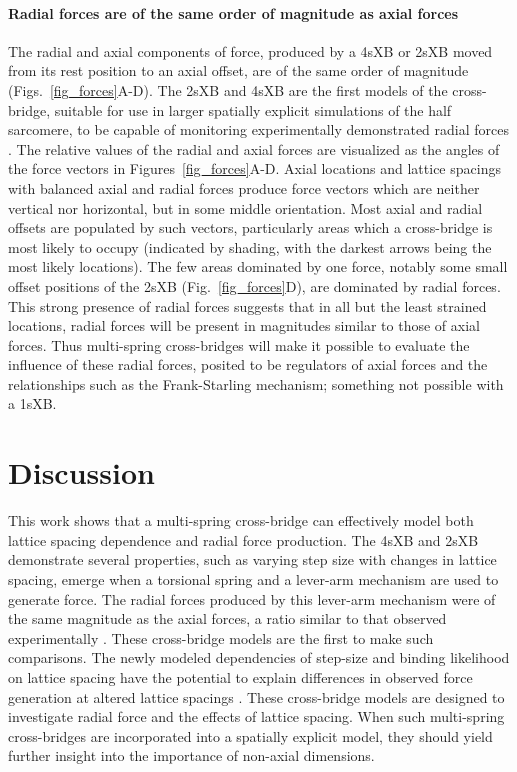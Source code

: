 \documentclass[]{article}
\begin{document}
\paragraph{Radial forces are of the same order of magnitude as axial forces} %
The radial and axial components of force, produced by a 4sXB or 2sXB moved from its rest position to an axial offset, are of the same order of magnitude (Figs.~\ref{fig_forces}A-D). 
The 2sXB and 4sXB are the first models of the cross-bridge, suitable for use in larger spatially explicit simulations of the half sarcomere, to be capable of monitoring experimentally demonstrated radial forces \citep{Cecchi1990, Millman1998}. 
The relative values of the radial and axial forces are visualized as the angles of the force vectors in Figures~\ref{fig_forces}A-D. 
Axial locations and lattice spacings with balanced axial and radial forces produce force vectors which are neither vertical nor horizontal, but in some middle orientation.
Most axial and radial offsets are populated by such vectors, particularly areas which a cross-bridge is most likely to occupy (indicated by shading, with the darkest arrows being the most likely locations). 
The few areas dominated by one force, notably some small offset positions of the 2sXB (Fig.~\ref{fig_forces}D), are dominated by radial forces.
This strong presence of radial forces suggests that in all but the least strained locations, radial forces will be present in magnitudes similar to those of axial forces. 
Thus multi-spring cross-bridges will make it possible to evaluate the influence of these radial forces, posited to be regulators of axial forces and the relationships such as the Frank-Starling mechanism; something not possible with a 1sXB\@. 



\section*{Discussion} %

This work shows that a multi-spring cross-bridge can effectively model both lattice spacing dependence and radial force production. 
The 4sXB and 2sXB demonstrate several properties, such as varying step size with changes in lattice spacing, emerge when a torsional spring and a lever-arm mechanism are used to generate force. 
The radial forces produced by this lever-arm mechanism were of the same magnitude as the axial forces, a ratio similar to that observed experimentally \citep{Cecchi1990,Brenner1991}. 
These cross-bridge models are the first to make such comparisons.
The newly modeled dependencies of step-size and binding likelihood on lattice spacing have the potential to explain differences in observed force generation at altered lattice spacings  \citep{Millman1998}. 
These cross-bridge models are designed to investigate radial force and the effects of lattice spacing. 
When such multi-spring cross-bridges are incorporated into a spatially explicit model, they should yield further insight into the importance of non-axial dimensions. 
\end{document}
